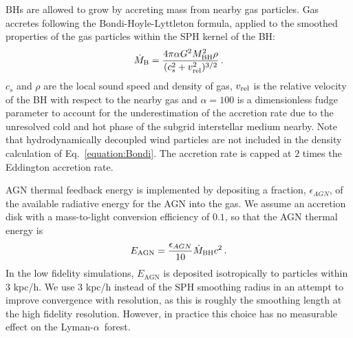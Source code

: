 \documentclass[a4paper,11pt]{article}
\newcommand{\Lya}{Lyman-$\alpha$}
\begin{document}
BHs are allowed to grow by accreting mass from nearby gas particles. Gas accretes following the Bondi-Hoyle-Lyttleton formula, applied to the smoothed properties of the gas particles within the SPH kernel of the BH:
\begin{equation}
\label{equation:Bondi}
    \dot{M}_{\rm B} = \frac{4 \pi \alpha G^2 M_{\rm BH}^2 \rho}{(c^2_s+v_{\rm rel}^2)^{3/2}}\,.
\end{equation}
$c_s$ and $\rho$ are the local sound speed and density of gas, $v_{\rm rel}$ is the relative velocity of the BH with respect to the nearby gas and $\alpha = 100$ is a dimensionless fudge parameter to account for the underestimation of the accretion rate due to the unresolved cold and hot phase of the subgrid interstellar medium nearby.
Note that hydrodynamically decoupled wind particles are not included in the density calculation of Eq.~\ref{equation:Bondi}. The accretion rate is capped at $2$ times the Eddington accretion rate.

AGN thermal feedback energy is implemented by depositing a fraction, $\epsilon_{AGN}$, of the available radiative energy for the AGN into the gas. We assume an accretion disk with a mass-to-light conversion efficiency of $0.1$, so that the AGN thermal energy is \cite{Shakura:1973}
\begin{equation}
\label{equation:Lbol}
    E_\mathrm{AGN} = \frac{\epsilon_{AGN}}{10} \dot{M}_{\rm BH} c^2\,.
\end{equation}
In the low fidelity simulations, $E_\mathrm{AGN}$ is deposited isotropically to particles within $3$ kpc/h. We use $3$ kpc/h instead of the SPH smoothing radius in an attempt to improve convergence with resolution, as this is roughly the smoothing length at the high fidelity resolution. However, in practice this choice has no measurable effect on the \Lya~forest. %
\end{document}
